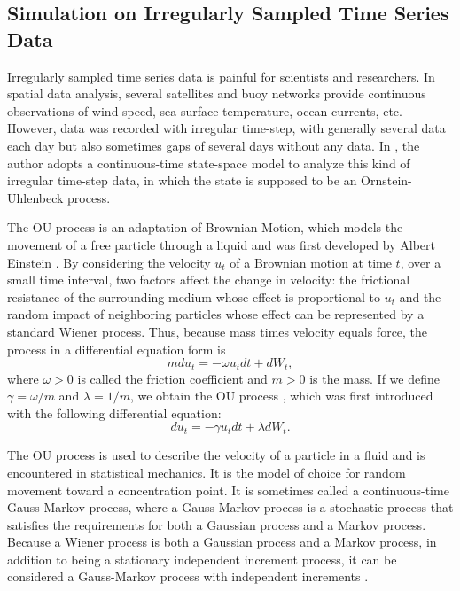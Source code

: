 \subsection{Simulation on Irregularly Sampled Time Series Data}

Irregularly sampled time series data is painful for scientists and researchers. In spatial data analysis, several satellites and buoy networks provide continuous observations of wind speed, sea surface temperature, ocean currents, etc. However, data was recorded with irregular time-step, with generally several data each day but also sometimes gaps of several days without any data. In \cite{tandeo2011linear}, the author adopts a continuous-time state-space model to analyze this kind of irregular time-step data, in which the state is supposed to be an Ornstein-Uhlenbeck process. 

The OU process is an adaptation of Brownian Motion, which models the movement of a free particle through a liquid and was first developed by Albert Einstein \cite{einstein1956investigations}. 
By considering the velocity $u_t$ of a Brownian motion at time $t$, over a small time interval, two factors affect the change in velocity: the frictional resistance of the surrounding medium whose effect is proportional to $u_t$ and the random impact of neighboring particles whose effect can be represented by a standard Wiener process. Thus, because mass times velocity equals force, the process in a differential equation form is 
\begin{equation*}
mdu_t = -\omega u_tdt+dW_t,
\end{equation*}
where $\omega>0$ is called the friction coefficient and $m>0$ is the mass. If we define $\gamma = \omega /m$ and $\lambda = 1/m$, we obtain the OU process \cite{vaughan2015goodness}, which was first introduced with the following differential equation:
\begin{equation*}
du_t= -\gamma u_tdt+\lambda dW_t.
\end{equation*}


The OU process is used to describe the velocity of a particle in a fluid and is encountered in statistical mechanics. It is the model of choice for random movement toward a concentration point. It is sometimes called a continuous-time Gauss Markov process, where a Gauss Markov process is a stochastic process that satisfies the requirements for both a Gaussian process and a Markov process. Because a Wiener process is both a Gaussian process and a Markov process, in addition to being a stationary independent increment process, it can be considered a Gauss-Markov process with independent increments \cite{kijima1997markov}. 

